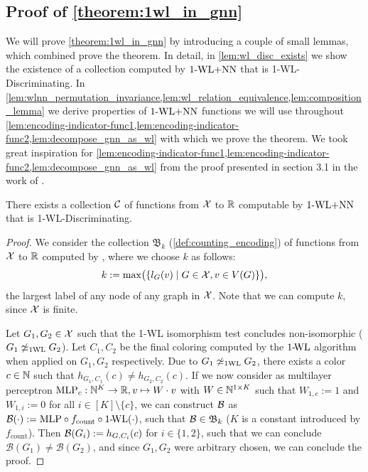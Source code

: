 \subsection{Proof of \cref{theorem:1wl_in_gnn}}
We will prove \cref{theorem:1wl_in_gnn} by introducing a couple of small lemmas, which combined prove the theorem. In detail, in \cref{lem:wl_disc_exists} we show the existence of a collection computed by $\text{1-WL+NN}$ that is 1-\!WL-Discriminating. In \cref{lem:wlnn_permutation_invariance,lem:wl_relation_equivalence,lem:composition_lemma} we derive properties of $\text{1-WL+NN}$ functions we will use throughout \cref{lem:encoding-indicator-func1,lem:encoding-indicator-func2,lem:decompose_gnn_as_wl} with which we prove the theorem.
We took great inspiration for \cref{lem:encoding-indicator-func1,lem:encoding-indicator-func2,lem:decompose_gnn_as_wl} from the proof presented in section 3.1 in the work of \cite{Chen2019}.

\begin{lemma}\label{lem:wl_disc_exists}
    There exists a collection $\mathcal{C}$ of functions from $\mathcal{X}$ to $\mathbb{R}$ computable by $\text{1-WL+NN}$ that is 1-\!WL-Discriminating.
\end{lemma}
\begin{proof}
We consider the collection $\mathfrak{B}_k$ (\cref{def:counting_encoding}) of functions from $\mathcal{X}$ to $\mathbb{R}$ computed by \wlnn, where we choose $k$ as follows:
\begin{equation*}
    k := \max \bigl( \{ l_G(v) \mid G \in \mathcal{X}, v \in V(G)\} \bigr),
\end{equation*}
the largest label of any node of any graph in $\mathcal{X}$. Note that we can compute $k$, since $\mathcal{X}$ is finite.

Let $G_1, G_2 \in \mathcal{X}$ such that the 1-WL isomorphism test concludes non-isomorphic ($G_1 \not\simeq_{\text{1WL}} G_2$). Let $C_1, C_2$ be the final coloring computed by the $\text{1-\!WL}$ algorithm when applied on $G_1, G_2$ respectively.
Due to $G_1 \not\simeq_{\text{1WL}} G_2$, there exists a color $c \in \mathbb{N}$ such that $h_{G_1, C_1}(c) \neq h_{G_2, C_2}(c)$. If we now consider as multilayer perceptron $\text{MLP}_c: \mathbb{N}^K \rightarrow \mathbb{R}, v \mapsto W \cdot v$ with $W \in \mathbb{N}^{1 \times K}$ such that $W_{1,c} := 1$ and $W_{1,i} := 0$ for all $i \in [K] \setminus \{c\}$, we can construct $\mathcal{B}$ as $\mathcal{B}(\cdot) := \text{MLP} \circ f_{\text{count}} \circ \text{1-\!WL}(\cdot)$, such that $\mathcal{B} \in \mathfrak{B}_k$ ($K$ is a constant introduced by $f_\text{count}$). Then $\mathcal{B}(G_i) := h_{G, C_i}(c)$ for $i \in \{1, 2\}$, such that we can conclude $\mathcal{B}(G_1) \neq \mathcal{B}(G_2)$, and since $G_1,G_2$ were arbitrary chosen, we can conclude the proof.
\end{proof}


